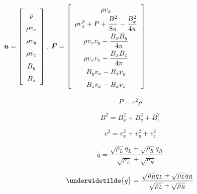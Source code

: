 \begin{center}
$\renewcommand{\arraystretch}{1.5}
\mbox{\boldmath $u$} =
\left[
\begin{array}{c}
\rho \\
\rho v_{x} \\
\rho v_{y} \\
\rho v_{z} \\
B_{y} \\
B_{z} \\
\end{array}
\right], \;
\renewcommand{\arraystretch}{1.5}
\mbox{\boldmath $F$} =
\left[
\begin{array}{c}
\rho v_{x} \\
\displaystyle \rho v_{x}^2 + P + \frac{B^2}{8 \pi} - \frac{B_{x}^2}{4 \pi} 
\vspace{4pt} \\
\displaystyle \rho v_{x} v_{y} -\frac{B_{x}B_{y}}{4 \pi} 
\vspace{4pt} \\
\displaystyle \rho v_{x} v_{z} -\frac{B_{x}B_{z}}{4 \pi} \\
B_{y} v_{x} - B_{x} v_{y} \\
B_{z} v_{x} - B_{x} v_{z} \\
\end{array}
\right]$\end{center}

\begin{equation}
P = c^2 \rho
\end{equation}

\begin{equation}
B^2 = B_{x}^2 + B_{y}^2 + B_{z}^2 
\end{equation}

\begin{equation}
v^2 = v_{x}^2 + v_{y}^2 + v_{z}^2 
\end{equation}

\newpage

\begin{equation}
\widetilde{q} = \frac{\sqrt{\rho_{L}} q_{L} 
+ \sqrt{\rho_{R}} q_{R}}{\sqrt{\rho_{L}} + \sqrt{\rho_{R}}}
\end{equation}

\begin{equation}
\underwidetilde{q} = \frac{\sqrt{\rho_{R}} q_{L} 
+ \sqrt{\rho_{L}} q_{R}}{\sqrt{\rho_{L}} + \sqrt{\rho_{R}}}
\end{equation}

